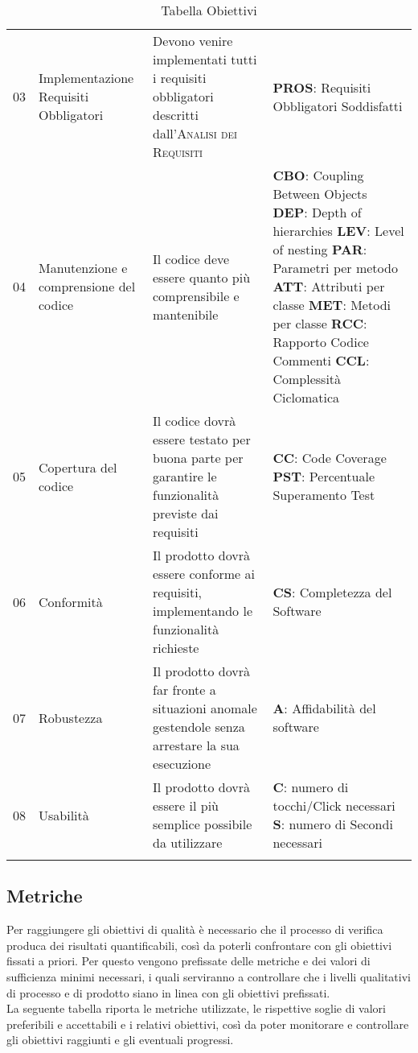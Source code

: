 \begin{longtable}{ 
		>{}p{} 
		>{}p{}
        >{}p{}
        >{\centering}p{} }
        03 & Implementazione Requisiti Obbligatori & Devono venire implementati tutti i requisiti obbligatori descritti dall'\textsc{Analisi dei Requisiti} & \textbf{PROS}: Requisiti Obbligatori Soddisfatti \tabularnewline

        04 & Manutenzione e comprensione del codice & Il codice deve essere quanto più comprensibile e mantenibile & \textbf{CBO}: Coupling Between Objects \newline \textbf{DEP}: Depth of hierarchies \newline \textbf{LEV}: Level of nesting \newline \textbf{PAR}: Parametri per metodo \newline \textbf{ATT}: Attributi per classe \newline \textbf{MET}: Metodi per classe \newline\textbf{RCC}: Rapporto Codice Commenti \newline\textbf{{CCL}}: Complessità Ciclomatica \tabularnewline

        05 & Copertura del codice & Il codice dovrà essere testato per buona parte per garantire le funzionalità previste dai requisiti &
        	\textbf{CC}: Code Coverage \newline
        	\textbf{PST}: Percentuale Superamento Test \tabularnewline

        06 & Conformità & Il prodotto dovrà essere conforme ai requisiti, implementando le funzionalità richieste & \textbf{CS}: Completezza del Software \tabularnewline

        07 & Robustezza & Il prodotto dovrà far fronte a situazioni anomale gestendole senza arrestare la sua esecuzione & \textbf{A}: Affidabilità del software \tabularnewline

        08 & Usabilità & Il prodotto dovrà essere il più semplice possibile da utilizzare & \textbf{C}: numero di tocchi/Click necessari \newline \textbf{S}: numero di Secondi necessari\tabularnewline
        \caption{Tabella Obiettivi}
    \end{longtable}


\pagebreak
\subsection{Metriche}
Per raggiungere gli obiettivi di qualità è necessario che il processo di verifica produca dei risultati quantificabili, così da poterli confrontare con gli obiettivi fissati a priori. Per questo vengono prefissate delle metriche e dei valori di sufficienza minimi necessari, i quali serviranno a controllare che i livelli qualitativi di processo e di prodotto siano in linea con gli obiettivi prefissati.\\La seguente tabella riporta le metriche utilizzate, le rispettive soglie di valori preferibili e accettabili e i relativi obiettivi, così da poter monitorare e controllare gli obiettivi raggiunti e gli eventuali progressi.

